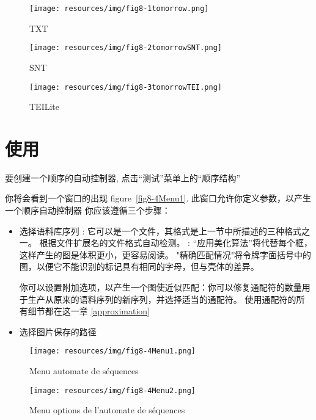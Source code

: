 \begin{figure}[h!]
	\begin{minipage}[h!]{0.5\linewidth}
		\centering
		\texttt{[image: resources/img/fig8-1tomorrow.png]}
		\caption{TXT\label{fig8-1CorpusTxt}}
		\label{fig7-TXT}
	\end{minipage}
	\hspace{0.1cm}
	\begin{minipage}[h!]{0.5\linewidth}
		\centering
		\texttt{[image: resources/img/fig8-2tomorrowSNT.png]}
		\caption{SNT\label{fig8-2CorpusSNT}}
	\end{minipage}
	\hspace{0.1cm}
\end{figure}
\begin{figure}[h!]
	\begin{minipage}[h!]{\linewidth}
		\centering
			\texttt{[image: resources/img/fig8-3tomorrowTEI.png]}
			\caption{TEILite\label{fig8-3CorpusTEI}}
	\end{minipage}
\end{figure}


\section{使用}

要创建一个顺序的自动控制器, 
点击“测试”菜单上的“顺序结构”

你将会看到一个窗口的出现 figure~\ref{fig8-4Menu1}.
此窗口允许你定义参数，以产生一个顺序自动控制器
你应该遵循三个步骤：
\begin{itemize}
\item 选择语料库序列 : 
它可以是一个文件，其格式是上一节中所描述的三种格式之一。
根据文件扩展名的文件格式自动检测。
 :
“应用美化算法”将代替每个框，这样产生的图是体积更小，更容易阅读。
"精确匹配情况"将令牌字面括号中的图，以便它不能识别的标记具有相同的字母，但与壳体的差异。


你可以设置附加选项，以产生一个图使近似匹配：你可以修复通配符的数量用于生产从原来的语料序列的新序列，并选择适当的通配符。
使用通配符的所有细节都在这一章 
\ref{approximation}

\item 选择图片保存的路径
\end{itemize}
\medskip
\begin{figure}[h!]
	\begin{minipage}[h!]{0.5\linewidth}	
		\centering
			\texttt{[image: resources/img/fig8-4Menu1.png]}
			\caption{Menu automate de séquences\label{fig8-4Menu1}}
	\end{minipage}	
	\hspace{0.3cm}
	\begin{minipage}[h!]{0.5\linewidth}	
		\centering
			\texttt{[image: resources/img/fig8-4Menu2.png]}
			\caption{Menu options de l'automate de séquences\label{fig8-4Menu2}}
	\end{minipage}
\end{figure}

